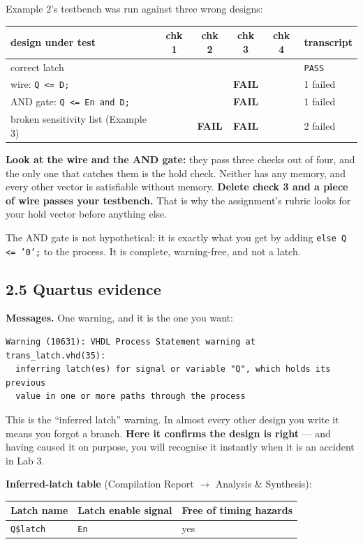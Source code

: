 \documentclass[11pt]{article}
\newcommand{\code}[1]{\texttt{#1}}
\newcommand{\ok}{\checkmark}
\newcommand{\bad}{\textbf{FAIL}}
\begin{document}
Example 2's testbench was run against three wrong designs:

\begin{center}
\begin{tabular}{lcccc|l}
\toprule
design under test & chk 1 & chk 2 & chk 3 & chk 4 & transcript \\
\midrule
correct latch & \ok & \ok & \ok & \ok & \code{PASS} \\
wire: \code{Q <= D;} & \ok & \ok & \bad & \ok & 1 failed \\
AND gate: \code{Q <= En and D;} & \ok & \ok & \bad & \ok & 1 failed \\
broken sensitivity list (Example 3) & \ok & \bad & \bad & \ok & 2 failed \\
\bottomrule
\end{tabular}
\end{center}

\textbf{Look at the wire and the AND gate:} they pass three checks out of four, and
the only one that catches them is the hold check. Neither has any memory, and every
other vector is satisfiable without memory. \textbf{Delete check 3 and a piece of
wire passes your testbench.} That is why the assignment's rubric looks for your hold
vector before anything else.

The AND gate is not hypothetical: it is exactly what you get by adding
\code{else Q <= '0';} to the process. It is complete, warning-free, and not a latch.

\subsection*{2.5 Quartus evidence}

\textbf{Messages.} One warning, and it is the one you want:
\begin{lstlisting}
Warning (10631): VHDL Process Statement warning at trans_latch.vhd(35):
  inferring latch(es) for signal or variable "Q", which holds its previous
  value in one or more paths through the process
\end{lstlisting}

This is the ``inferred latch'' warning. In almost every other design you write it
means you forgot a branch. \textbf{Here it confirms the design is right} --- and
having caused it on purpose, you will recognise it instantly when it is an accident
in Lab 3.

\textbf{Inferred-latch table} (Compilation Report $\rightarrow$ Analysis \& Synthesis):
\begin{center}
\begin{tabular}{lll}
\toprule
Latch name & Latch enable signal & Free of timing hazards \\
\midrule
\code{Q\$latch} & \code{En} & yes \\
\bottomrule
\end{tabular}
\end{center}
\end{document}
